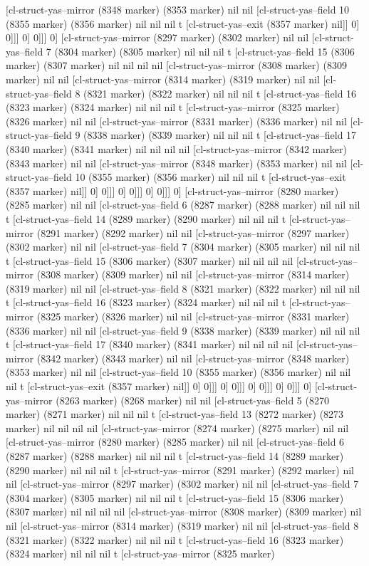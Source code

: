 {{[cl-struct-yas--mirror (8348 marker) (8353 marker) nil nil [cl-struct-yas--field 10 (8355 marker) (8356 marker) nil nil nil t [cl-struct-yas--exit (8357 marker) nil]] 0] 0]]] 0] 0]]] 0] [cl-struct-yas--mirror (8297 marker) (8302 marker) nil nil [cl-struct-yas--field 7 (8304 marker) (8305 marker) nil nil nil t [cl-struct-yas--field 15 (8306 marker) (8307 marker) nil nil nil nil [cl-struct-yas--mirror (8308 marker) (8309 marker) nil nil [cl-struct-yas--mirror (8314 marker) (8319 marker) nil nil [cl-struct-yas--field 8 (8321 marker) (8322 marker) nil nil nil t [cl-struct-yas--field 16 (8323 marker) (8324 marker) nil nil nil t [cl-struct-yas--mirror (8325 marker) (8326 marker) nil nil [cl-struct-yas--mirror (8331 marker) (8336 marker) nil nil [cl-struct-yas--field 9 (8338 marker) (8339 marker) nil nil nil t [cl-struct-yas--field 17 (8340 marker) (8341 marker) nil nil nil nil [cl-struct-yas--mirror (8342 marker) (8343 marker) nil nil [cl-struct-yas--mirror (8348 marker) (8353 marker) nil nil [cl-struct-yas--field 10 (8355 marker) (8356 marker) nil nil nil t [cl-struct-yas--exit (8357 marker) nil]] 0] 0]]] 0] 0]]] 0] 0]]] 0] [cl-struct-yas--mirror (8280 marker) (8285 marker) nil nil [cl-struct-yas--field 6 (8287 marker) (8288 marker) nil nil nil t [cl-struct-yas--field 14 (8289 marker) (8290 marker) nil nil nil t [cl-struct-yas--mirror (8291 marker) (8292 marker) nil nil [cl-struct-yas--mirror (8297 marker) (8302 marker) nil nil [cl-struct-yas--field 7 (8304 marker) (8305 marker) nil nil nil t [cl-struct-yas--field 15 (8306 marker) (8307 marker) nil nil nil nil [cl-struct-yas--mirror (8308 marker) (8309 marker) nil nil [cl-struct-yas--mirror (8314 marker) (8319 marker) nil nil [cl-struct-yas--field 8 (8321 marker) (8322 marker) nil nil nil t [cl-struct-yas--field 16 (8323 marker) (8324 marker) nil nil nil t [cl-struct-yas--mirror (8325 marker) (8326 marker) nil nil [cl-struct-yas--mirror (8331 marker) (8336 marker) nil nil [cl-struct-yas--field 9 (8338 marker) (8339 marker) nil nil nil t [cl-struct-yas--field 17 (8340 marker) (8341 marker) nil nil nil nil [cl-struct-yas--mirror (8342 marker) (8343 marker) nil nil [cl-struct-yas--mirror (8348 marker) (8353 marker) nil nil [cl-struct-yas--field 10 (8355 marker) (8356 marker) nil nil nil t [cl-struct-yas--exit (8357 marker) nil]] 0] 0]]] 0] 0]]] 0] 0]]] 0] 0]]] 0] [cl-struct-yas--mirror (8263 marker) (8268 marker) nil nil [cl-struct-yas--field 5 (8270 marker) (8271 marker) nil nil nil t [cl-struct-yas--field 13 (8272 marker) (8273 marker) nil nil nil nil [cl-struct-yas--mirror (8274 marker) (8275 marker) nil nil [cl-struct-yas--mirror (8280 marker) (8285 marker) nil nil [cl-struct-yas--field 6 (8287 marker) (8288 marker) nil nil nil t [cl-struct-yas--field 14 (8289 marker) (8290 marker) nil nil nil t [cl-struct-yas--mirror (8291 marker) (8292 marker) nil nil [cl-struct-yas--mirror (8297 marker) (8302 marker) nil nil [cl-struct-yas--field 7 (8304 marker) (8305 marker) nil nil nil t [cl-struct-yas--field 15 (8306 marker) (8307 marker) nil nil nil nil [cl-struct-yas--mirror (8308 marker) (8309 marker) nil nil [cl-struct-yas--mirror (8314 marker) (8319 marker) nil nil [cl-struct-yas--field 8 (8321 marker) (8322 marker) nil nil nil t [cl-struct-yas--field 16 (8323 marker) (8324 marker) nil nil nil t [cl-struct-yas--mirror (8325 marker) }}
